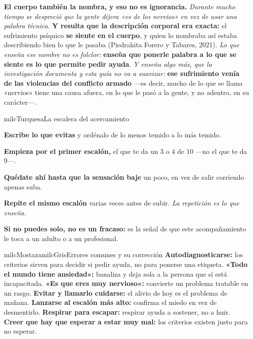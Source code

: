 \documentclass[11pt,letterpaper]{article}
\newcommand{\milcpaso}[3]{%
\Needspace{4\baselineskip}%
\begin{tcolorbox}[enhanced,colback=white,colframe=milcLinea,arc=1.5mm,boxrule=.9pt,
  left=14mm,right=4mm,top=3mm,bottom=3mm,before skip=4pt,after skip=4pt,
  fontupper=\RaggedRight,
  overlay={\node[anchor=north west,circle,fill=#2,text=white,inner sep=0pt,
    minimum size=7.4mm,font=\sffamily\bfseries\small]
    at ([xshift=3.6mm,yshift=-3.2mm]frame.north west) {#1};}]
#3
\end{tcolorbox}}
\begin{document}
\milcpaso{4}{milcTurquesa}{\textbf{El cuerpo también la nombra, y eso no es ignorancia.} \emph{Durante mucho tiempo se despreció que la gente dijera «es de los nervios» en vez de usar una palabra técnica.} \textbf{Y resulta que la descripción corporal era exacta:} el sufrimiento psíquico \textbf{se siente en el cuerpo}, y quien lo nombraba así estaba describiendo bien lo que le pasaba (Piedrahita Forero y Tabares, 2021). \emph{Lo que enseña ese nombre no es folclor:} \textbf{enseña que ponerle palabra a lo que se siente es lo que permite pedir ayuda}. \emph{Y enseña algo más, que la investigación documenta y esta guía no va a suavizar:} \textbf{ese sufrimiento venía de las violencias del conflicto armado} ---es decir, mucho de lo que se llama «nervios» tiene una causa afuera, en lo que le pasó a la gente, y no adentro, en su carácter---.}

\begin{drawbox}{milcTurquesa}{La escalera del acercamiento}
\begin{pasoslista}
\item \textbf{Escribe lo que evitas} y ordénalo de lo menos temido a lo más temido.
\item \textbf{Empieza por el primer escalón,} el que te da un 3 o 4 de 10 ---no el que te da 9---.
\item \textbf{Quédate ahí hasta que la sensación baje} un poco, en vez de salir corriendo apenas suba.
\item \textbf{Repite el mismo escalón} varias veces antes de subir. \emph{La repetición es lo que enseña.}
\item \textbf{Si no puedes solo, no es un fracaso:} es la señal de que este acompañamiento le toca a un adulto o a un profesional.
\end{pasoslista}
\end{drawbox}

\begin{softbox}{milcMostaza}{milcGris}{Errores comunes y su corrección}
\textbf{Autodiagnosticarse:} los criterios sirven para decidir si pedir ayuda, no para ponerse una etiqueta. \textbf{«Todo el mundo tiene ansiedad»:} banaliza y deja sola a la persona que sí está incapacitada. \textbf{«Es que eres muy nervioso»:} convierte un problema tratable en un rasgo. \textbf{Evitar y llamarlo cuidarse:} el alivio de hoy es el problema de mañana. \textbf{Lanzarse al escalón más alto:} confirma el miedo en vez de desmentirlo. \textbf{Respirar para escapar:} respirar ayuda a sostener, no a huir. \textbf{Creer que hay que esperar a estar muy mal:} los criterios existen justo para no esperar.
\end{softbox}
\end{document}
